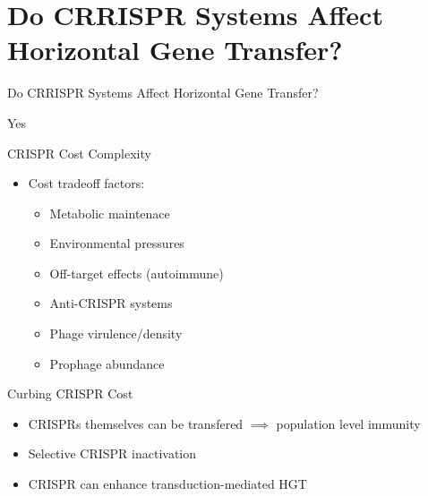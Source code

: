 \documentclass[dvipsnames]{beamer}
\begin{document}
\section{Do CRRISPR Systems Affect Horizontal Gene Transfer?}
\begin{frame}{}
    \begin{center}
        \Huge \textcolor{OliveGreen}{Do CRRISPR Systems Affect Horizontal Gene Transfer?}
    \end{center}
    \addtocounter{framenumber}{-1}
\end{frame}
\begin{frame}[fragile]{}
    \begin{center}
        \Huge Yes
    \end{center}
\end{frame}
\begin{frame}[fragile]{CRISPR Cost Complexity}
    \begin{itemize}
        \item<2-> Cost tradeoff factors:
        \begin{itemize}
            \item<3-> Metabolic maintenace\autocite{crispgen}
            \item<4-> Environmental pressures\autocite{hospital}
            \item<5-> Off-target effects (autoimmune)\autocite{selfcrisp}
            \item<6-> Anti-CRISPR systems\autocite{acqorres}
            \item<7-> Phage virulence/density\autocite{acqorres}
            \item<8-> Prophage abundance\autocite{transhgt}
        \end{itemize}
    \end{itemize}
\end{frame}
\begin{frame}[fragile]{Curbing CRISPR Cost}
    \begin{itemize}
        \item<2-> CRISPRs themselves can be transfered $\implies$ population level immunity\autocite{crisprlgt}
        \item<3-> Selective CRISPR inactivation\autocite{crispgen}
        \item<4-> CRISPR can enhance transduction-mediated HGT\autocite{transhgt}
    \end{itemize}
\end{frame}
\end{document}
